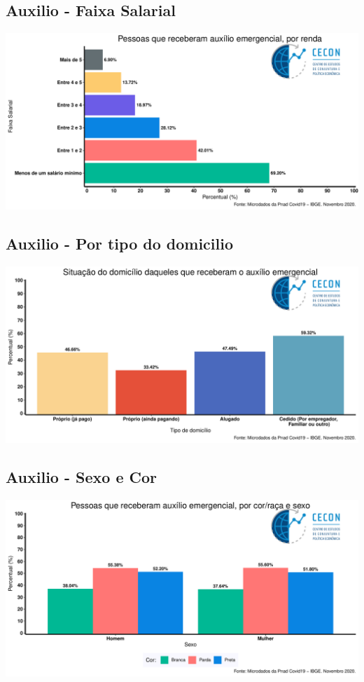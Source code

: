 \documentclass{SelfArx}
\begin{document}
\subsection*{Auxilio - Faixa Salarial}
\label{sec:org8f5a7df}
\begin{center}
\includegraphics[width=.9\linewidth]{./figs/PNAD_COVID/auxilio_renda.pdf}
\end{center}
\subsection*{Auxilio - Por tipo do domicilio}
\label{sec:org5a7f496}
\begin{center}
\includegraphics[width=.9\linewidth]{./figs/PNAD_COVID/auxilio_domicilio.pdf}
\end{center}
\subsection*{Auxilio - Sexo e Cor}
\label{sec:org5720b9a}
\begin{center}
\includegraphics[width=.9\linewidth]{./figs/PNAD_COVID/auxilio_cor_sexo.pdf}
\end{center}
\end{document}
